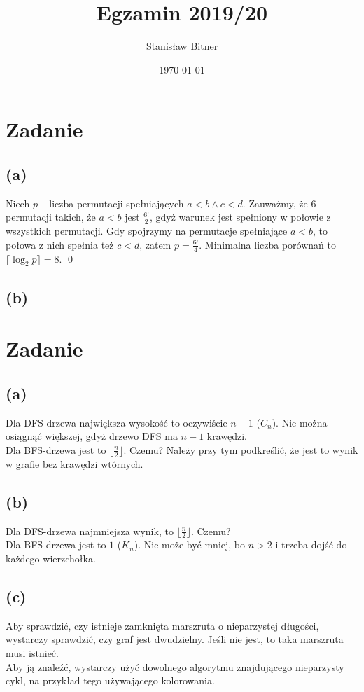 \documentclass[12pt, a4paper]{article}
\title{Egzamin 2019/20}
\author{Stanisław Bitner}
\date{\today}
\newcounter{zadanie}
\newcommand{\zadanie}{\addtocounter{zadanie}{1}\section*{Zadanie \arabic{zadanie}}}
\begin{document}
\maketitle
\zadanie{}
\subsection*{(a)}
Niech $p$ -- liczba permutacji spełniających $a<b \land c<d$. Zauważmy, że
6-permutacji takich, że $a<b$ jest $\frac{6!}{2}$, gdyż warunek jest spełniony
w połowie z wszystkich permutacji. Gdy spojrzymy na permutacje spełniające
$a<b$, to połowa z nich spełnia też $c<d$, zatem $p = \frac{6!}{4}$. Minimalna
liczba porównań to $\lceil\log_2{p}\rceil = 8$. \qed

\subsection*{(b)}

\zadanie{}
\subsection*{(a)}
Dla DFS-drzewa największa wysokość to oczywiście $n-1$ ($C_n$). Nie można
osiągnąć większej, gdyż drzewo DFS ma $n-1$ krawędzi.\\
Dla BFS-drzewa jest to $\lfloor\frac{n}{2}\rfloor$. Czemu? Należy przy tym podkreślić,
że jest to wynik w grafie bez krawędzi wtórnych.

\subsection*{(b)}
Dla DFS-drzewa najmniejsza wynik, to $\lfloor\frac{n}{2}\rfloor$. Czemu?\\
Dla BFS-drzewa jest to $1$ ($K_n$). Nie może być mniej, bo $n>2$ i trzeba dojść
do każdego wierzchołka.

\subsection*{(c)}
Aby sprawdzić, czy istnieje zamknięta marszruta o nieparzystej długości,
wystarczy sprawdzić, czy graf jest dwudzielny. Jeśli nie jest, to taka
marszruta musi istnieć.\\
Aby ją znaleźć, wystarczy użyć dowolnego algorytmu znajdującego nieparzysty
cykl, na przykład tego używającego kolorowania.
\end{document}
